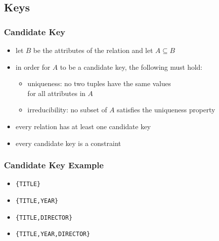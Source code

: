 \documentclass[dvipsnames]{beamer}
\theoremstyle{plain}
\begin{document}
\subsection{Keys}

\begin{frame}
  \frametitle{Candidate Key}

  \begin{itemize}
    \item let $B$ be the attributes of the relation and let $A \subseteq B$

    \item in order for $A$ to be a candidate key, the following must hold:

    \pause
    \begin{itemize}
      \item \alert{uniqueness}: no two tuples have the same values\\
	for all attributes in $A$

      \pause
      \item \alert{irreducibility}: no subset of $A$ satisfies the uniqueness
        property
    \end{itemize}

    \pause
    \item every relation has at least one candidate key

    \pause
    \item every candidate key is a constraint
  \end{itemize}
\end{frame}

\begin{frame}
  \frametitle{Candidate Key Example}

  \begin{example}
    \begin{itemize}
      \item \texttt{\{TITLE\}}

      \pause
      \item \texttt{\{TITLE,YEAR\}}

      \pause
      \item \texttt{\{TITLE,DIRECTOR\}}

      \pause
      \item \texttt{\{TITLE,YEAR,DIRECTOR\}}
    \end{itemize}
  \end{example}
\end{frame}
\end{document}
